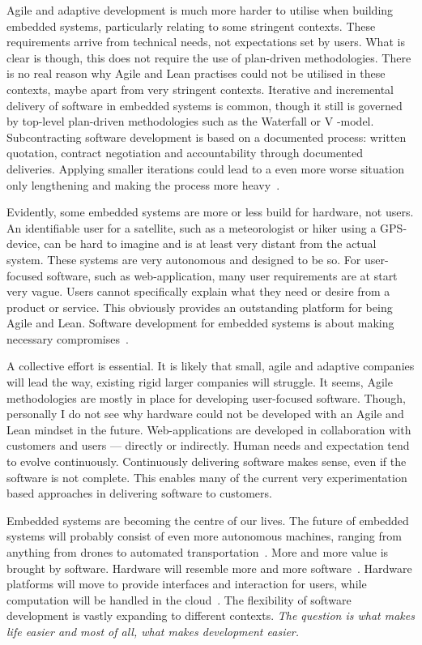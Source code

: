\documentclass[english]{tktltiki2}
\begin{document}
Agile and adaptive development is much more harder to utilise when building embedded systems, particularly relating to some stringent contexts. These requirements arrive from technical needs, not expectations set by users. What is clear is though, this does not require the use of plan-driven methodologies. There is no real reason why Agile and Lean practises could not be utilised in these contexts, maybe apart from very stringent contexts. Iterative and incremental delivery of software in embedded systems is common, though it still is governed by top-level plan-driven methodologies such as the Waterfall or V -model. Subcontracting software development is based on a documented process: written quotation, contract negotiation and accountability through documented deliveries. Applying smaller iterations could lead to a even more worse situation only lengthening and making the process more heavy~\cite{Hol15b}.

Evidently, some embedded systems are more or less build for hardware, not users. An identifiable user for a satellite, such as a meteorologist or hiker using a GPS-device, can be hard to imagine and is at least very distant from the actual system. These systems are very autonomous and designed to be so. For user-focused software, such as web-application, many user requirements are at start very vague. Users cannot specifically explain what they need or desire from a product or service. This obviously provides an outstanding platform for being Agile and Lean. Software development for embedded systems is about making necessary compromises~\cite{BT15}.

A collective effort is essential. It is likely that small, agile and adaptive companies will lead the way, existing rigid larger companies will struggle. It seems, Agile methodologies are mostly in place for developing user-focused software. Though, personally I do not see why hardware could not be developed with an Agile and Lean mindset in the future. Web-applications are developed in collaboration with customers and users — directly or indirectly. Human needs and expectation tend to evolve continuously. Continuously delivering software makes sense, even if the software is not complete. This enables many of the current very experimentation based approaches in delivering software to customers.

Embedded systems are becoming the centre of our lives. The future of embedded systems will probably consist of even more autonomous machines, ranging from anything from drones to automated transportation~\cite{Kri15}. More and more value is brought by software. Hardware will resemble more and more software~\cite{Hol15a}. Hardware platforms will move to provide interfaces and interaction for users, while computation will be handled in the cloud~\cite{BT15}. The flexibility of software development is vastly expanding to different contexts. \emph{The question is what makes life easier and most of all, what makes development easier.}
\end{document}
